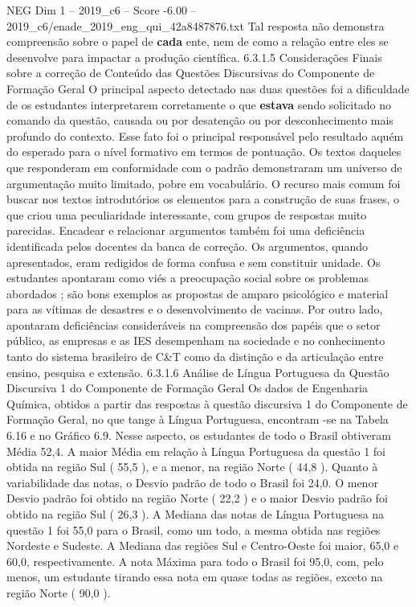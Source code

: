 \begin{textsample}{NEG Dim 1 – 2019\_c6 – Score -6.00 – 2019\_c6/enade\_2019\_eng\_qui\_42a8487876.txt}
Tal resposta não demonstra compreensão sobre o papel de \textbf{cada} ente, nem de como a relação entre eles se desenvolve para impactar a produção científica. 6.3.1.5 Considerações Finais sobre a correção de Conteúdo das Questões Discursivas do Componente de Formação Geral O principal aspecto detectado nas duas questões foi a dificuldade de os estudantes interpretarem corretamente o que \textbf{estava} sendo solicitado no comando da questão, causada ou por desatenção ou por desconhecimento mais profundo do contexto.
Esse fato foi o principal responsável pelo resultado aquém do esperado para o nível formativo em termos de pontuação.
Os textos daqueles que responderam em conformidade com o padrão demonstraram um universo de argumentação muito limitado, pobre em vocabulário.
O recurso mais comum foi buscar nos textos introdutórios os elementos para a construção de suas frases, o que criou uma peculiaridade interessante, com grupos de respostas muito parecidas.
Encadear e relacionar argumentos também foi uma deficiência identificada pelos docentes da banca de correção.
Os argumentos, quando apresentados, eram redigidos de forma confusa e sem constituir unidade.
Os estudantes apontaram como viés a preocupação social sobre os problemas abordados ; são bons exemplos as propostas de amparo psicológico e material para as vítimas de desastres e o desenvolvimento de vacinas.
Por outro lado, apontaram deficiências consideráveis na compreensão dos papéis que o setor público, as empresas e as IES desempenham na sociedade e no conhecimento tanto do sistema brasileiro de C\&T como da distinção e da articulação entre ensino, pesquisa e extensão. 6.3.1.6 Análise de Língua Portuguesa da Questão Discursiva 1 do Componente de Formação Geral Os dados de Engenharia Química, obtidos a partir das respostas à questão discursiva 1 do Componente de Formação Geral, no que tange à Língua Portuguesa, encontram -se na Tabela 6.16 e no Gráfico 6.9.
Nesse aspecto, os estudantes de todo o Brasil obtiveram Média 52,4.
A maior Média em relação à Língua Portuguesa da questão 1 foi obtida na região Sul ( 55,5 ), e a menor, na região Norte ( 44,8 ).
Quanto à variabilidade das notas, o Desvio padrão de todo o Brasil foi 24,0.
O menor Desvio padrão foi obtido na região Norte ( 22,2 ) e o maior Desvio padrão foi obtido na região Sul ( 26,3 ).
A Mediana das notas de Língua Portuguesa na questão 1 foi 55,0 para o Brasil, como um todo, a mesma obtida nas regiões Nordeste e Sudeste.
A Mediana das regiões Sul e Centro-Oeste foi maior, 65,0 e 60,0, respectivamente.
A nota Máxima para todo o Brasil foi 95,0, com, pelo menos, um estudante tirando essa nota em quase todas as regiões, exceto na região Norte ( 90,0 ).

\end{textsample}
